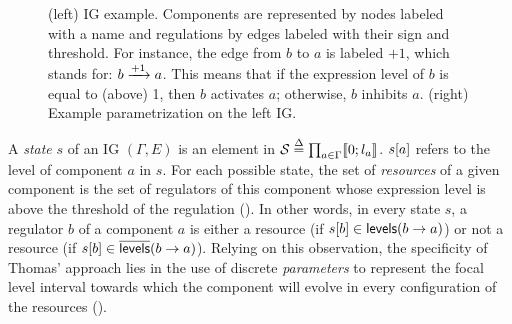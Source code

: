 \begin{figure}[t]
\begin{minipage}{0.4\linewidth}
\centering
{}
\end{minipage}
\begin{minipage}{0.6\linewidth}
\centering
{}
\end{minipage}
\caption{\label{fig:runningBRN}
  (left)
  IG example.
  Components are represented by nodes labeled with a name
  and regulations by edges labeled with their sign and threshold.
  For instance, the edge from $b$ to $a$ is labeled $+1$, which stands for: $b \xrightarrow{+ 1} a$.
  This means that if the expression level of $b$ is equal to (\ie above) 1, then $b$ activates $a$;
  otherwise, $b$ inhibits $a$.
  (right)
  Example parametrization on the left IG.
}
\end{figure}

A \emph{state} $s$ of an IG $(\Gamma, E)$ is an element in $\mathcal{S} \stackrel{\Delta}= \prod_{a \in \Gamma} \llbracket 0 ; l_a \rrbracket$.
${s[a]}$ refers to the level of component $a$ in $s$.
For each possible state, the set of \emph{resources} of a given component
is the set of regulators of this component whose expression level is above the threshold of the regulation ().
In other words, in every state $s$, a regulator $b$ of a component $a$
is either a resource (if ${s[b]} \in \mathsf{levels}(b\rightarrow a)$)
or not a resource (if ${s[b]} \in \overline{\mathsf{levels}}(b\rightarrow a)$).
Relying on this observation, the specificity of Thomas' approach lies in the use of discrete \emph{parameters} to represent the
focal level interval towards which the component will evolve in every configuration of the resources ().

